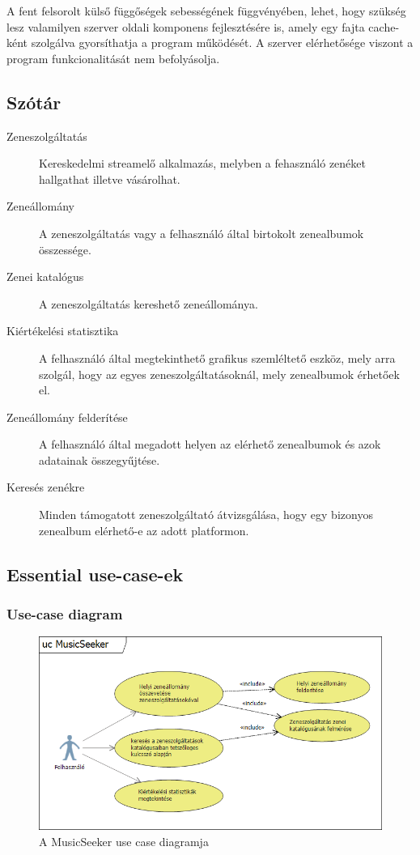 A fent felsorolt külső függőségek sebességének függvényében, lehet, hogy szükség lesz valamilyen szerver oldali komponens fejlesztésére is, amely egy fajta cache-ként szolgálva gyorsíthatja a program működését. A szerver elérhetősége viszont a program funkcionalitását nem befolyásolja.


\subsection{Szótár}
\label{sub:szotar}


\begin{description}
    \item[Zeneszolgáltatás] Kereskedelmi streamelő alkalmazás, melyben a fehasználó zenéket hallgathat illetve vásárolhat.
    \item[Zeneállomány] A zeneszolgáltatás vagy a felhasználó által birtokolt zenealbumok összessége.
    \item[Zenei katalógus] A zeneszolgáltatás kereshető zeneállománya.
    \item[Kiértékelési statisztika] A felhasználó által megtekinthető grafikus szemléltető eszköz, mely arra szolgál, hogy az egyes zeneszolgáltatásoknál, mely zenealbumok érhetőek el.
    \item[Zeneállomány felderítése] A felhasználó által megadott helyen az elérhető zenealbumok és azok adatainak összegyűjtése.
    \item[Keresés zenékre] Minden támogatott zeneszolgáltató átvizsgálása, hogy egy bizonyos zenealbum elérhető-e az adott platformon.
\end{description}

\subsection{Essential use-case-ek}
\label{sub:usecaseek}

\subsubsection{Use-case diagram}
\label{ssub:ucdiagram}

\begin{figure}[htp]
\centering
\includegraphics[scale=0.8]{img/01_UseCases.png}
\caption{A MusicSeeker use case diagramja}
\label{fig:01_UseCases}
\end{figure}

\newpage



